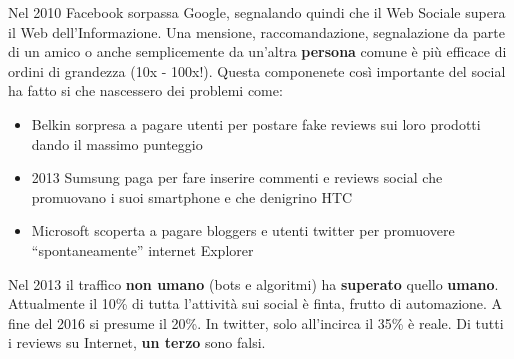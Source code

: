 Nel 2010 Facebook sorpassa Google, segnalando quindi che il Web Sociale supera il Web dell'Informazione. Una mensione, raccomandazione, segnalazione da parte di un amico o anche semplicemente da un'altra \textbf{persona} comune \`e pi\`u efficace di ordini di grandezza (10x - 100x!). Questa componenete cos\`i importante del social ha fatto si che nascessero dei problemi come:
\begin{itemize}

\item Belkin sorpresa a pagare utenti per postare fake reviews sui loro prodotti dando il massimo punteggio
\item 2013 Sumsung paga per fare inserire commenti e reviews social che promuovano i suoi smartphone e che denigrino HTC
\item Microsoft scoperta a pagare bloggers e utenti twitter per promuovere ``spontaneamente'' internet Explorer

\end{itemize}


Nel 2013 il traffico \textbf{non umano} (bots e algoritmi) ha \textbf{superato} quello \textbf{umano}. Attualmente il 10\% di tutta l'attivit\`a sui social \`e finta, frutto di automazione. A fine del 2016 si presume il 20\%. In twitter, solo all'incirca il 35\% \`e reale. Di tutti i reviews su Internet, \textbf{un terzo} sono falsi.

